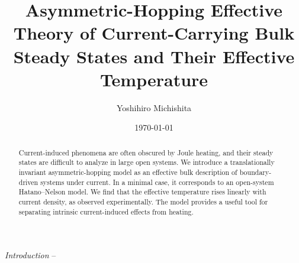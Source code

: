 \documentclass[a4paper, amsfonts, amssymb, amsmath, reprint, showkeys, nofootinbib, twoside,superscriptaddress, prl]{revtex4-2}
\begin{document}
\title{Asymmetric-Hopping Effective Theory of Current-Carrying Bulk Steady States and Their Effective Temperature}
\author{Yoshihiro Michishita}
    \date{\today} 
\begin{abstract}
    Current-induced phenomena are often obscured by Joule heating, and their steady states are difficult to analyze in large open systems. We introduce a translationally invariant asymmetric-hopping model as an effective bulk description of boundary-driven systems under current. In a minimal case, it corresponds to an open-system Hatano--Nelson model. We find that the effective temperature rises linearly with current density, as observed experimentally. The model provides a useful tool for separating intrinsic current-induced effects from heating.
\end{abstract}
\keywords{}
\maketitle
{\it{Introduction}} --
\end{document}
